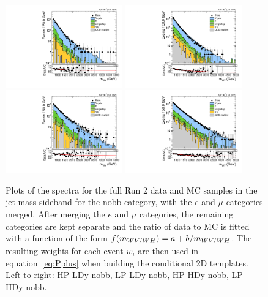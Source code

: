 \begin{figure}[htbp]
  \centering
  \includegraphics[width=0.45\textwidth]{fig/2Dfit/slopesSB_b1_allL_HP_nobb_LDy_Run2_mWV_1OverX.pdf}
  \includegraphics[width=0.45\textwidth]{fig/2Dfit/slopesSB_b1_allL_LP_nobb_LDy_Run2_mWV_1OverX.pdf}\\
  \includegraphics[width=0.45\textwidth]{fig/2Dfit/slopesSB_b1_allL_HP_nobb_HDy_Run2_mWV_1OverX.pdf}
  \includegraphics[width=0.45\textwidth]{fig/2Dfit/slopesSB_b1_allL_LP_nobb_HDy_Run2_mWV_1OverX.pdf}\\
  \caption{
    Plots of the \MVV spectra for the full Run 2 data and MC samples in the jet mass sideband for the nobb category, with the $e$ and $\mu$ categories merged.
    After merging the $e$ and $\mu$ categories, the remaining categories are kept separate and the ratio of data to MC is fitted with a function of the form $f(m_{WV/WH})=a+b/m_{WV/WH}$.
    The resulting weights for each event $w_i$ are then used in equation~\ref{eq:Pplus} when building the conditional 2D templates.
    Left to right: HP-LDy-nobb, LP-LDy-nobb, HP-HDy-nobb, LP-HDy-nobb.
  }
  \label{fig:nonResMvvSpectrumReweighting}
\end{figure}

